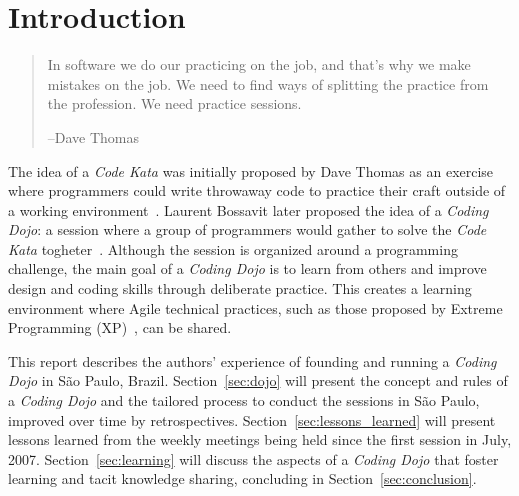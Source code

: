 \section{Introduction}\label{sec:introduction}

\begin{quote}
In software we do our practicing on the job, and that’s why we make mistakes on the job.
We need to find ways of splitting the practice from the profession. We need practice sessions.

--Dave Thomas
\end{quote}

The idea of a \emph{Code Kata} was initially proposed by Dave Thomas as an exercise where programmers
could write throwaway code to practice their craft outside of a working environment~\cite{DaveThomas}.
Laurent Bossavit later proposed the idea of a \emph{Coding Dojo}: a session where a group of programmers
would gather to solve the \emph{Code Kata} togheter~\cite{Bossavit}. Although the session is organized
around a programming challenge, the main goal of a \emph{Coding Dojo} is to learn from others and
improve design and coding skills through deliberate practice. This creates a learning environment where
Agile technical practices, such as those proposed by Extreme Programming (XP)~\cite{XP2E}, can be shared.

This report describes the authors' experience of founding and running a \emph{Coding Dojo} in
São Paulo, Brazil. Section~\ref{sec:dojo} will present the concept and rules of a \emph{Coding Dojo} and
the tailored process to conduct the sessions in São Paulo, improved over time by retrospectives.
Section~\ref{sec:lessons_learned} will present lessons learned from the weekly meetings being held since
the first session in July, 2007. Section~\ref{sec:learning} will discuss the aspects of a \emph{Coding Dojo}
that foster learning and tacit knowledge sharing, concluding in Section~\ref{sec:conclusion}.